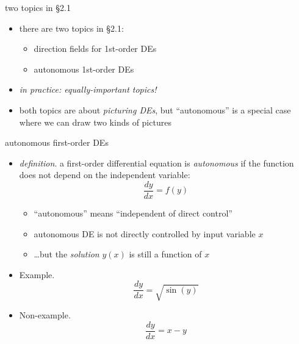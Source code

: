 \documentclass{beamer}
\begin{document}
\begin{frame}{two topics in \S 2.1}

\begin{itemize}
\item there are two topics in \S 2.1:
    \begin{itemize}
    \item direction fields for 1st-order DEs
    \item autonomous 1st-order DEs
    \end{itemize}
\item \emph{in practice: equally-important topics!}
\item both topics are about \emph{picturing DEs}, but ``autonomous'' is a special case where we can draw two kinds of pictures
\end{itemize}
\end{frame}


\begin{frame}{autonomous first-order DEs}

\begin{itemize}
\item \emph{definition}. a first-order differential equation is \emph{autonomous} if the function does not depend on the independent variable:
    $$\frac{dy}{dx} = f(y)$$

\vspace{-2mm}
    \begin{itemize}
    \item ``autonomous'' means ``independent of direct control''
    \item autonomous DE is not directly controlled by input variable $x$
    \item \dots but the \emph{solution} $y(x)$ is still a function of $x$
    \end{itemize}
\item Example.
    $$\frac{dy}{dx} = \sqrt{\sin(y)}$$
\item Non-example.
    $$\frac{dy}{dx} = x-y$$
\end{itemize}
\end{frame}
\end{document}

